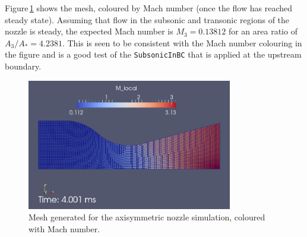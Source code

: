 

Figure\,\ref{back-mesh-fig} shows the mesh, coloured by Mach number 
(once the flow has reached steady state).
Assuming that flow in the subsonic and transonic regions of the nozzle is
steady, the expected Mach number is $M_3 = 0.13812$ for an area ratio of 
$A_3 / A_* = 4.2381$.
This is seen to be consistent with the Mach number colouring in the figure
and is a good test of the \verb!SubsonicInBC! that is applied at the 
upstream boundary.

\begin{figure}[htbp]
\begin{center}
\includegraphics[width=0.8\textwidth]{../2D/back-nozzle/back-mach-field-with-mesh.png}
\end{center}
\caption{Mesh generated for the axisymmetric nozzle simulation, coloured with Mach number.}
\label{back-mesh-fig}
\end{figure}

